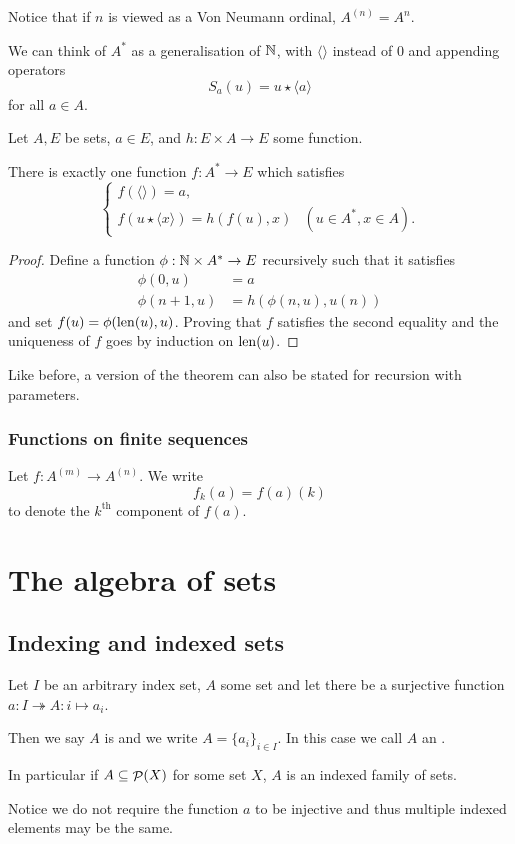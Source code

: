 Notice that if $n$ is viewed as a Von Neumann ordinal, $A^{(n)} = A^n$.

We can think of $A^*$ as a generalisation of $\mathbb{N}$, with $\langle\rangle$ instead of $0$ and appending operators
\[ S_a(u) = u\star \langle a\rangle \]
for all $a\in A$.
\begin{theorem}
Let $A,E$ be sets, $a\in E$, and $h:E\times A\to E$ some function.

There is exactly one function $f: A^*\to E$ which satisfies
\[ \begin{cases}
f(\langle\rangle) = a, \\
f(u\star \langle x\rangle) = h(f(u), x) & (u\in A^*, x\in A).
\end{cases} \]
\end{theorem}
\begin{proof}
Define a function $\phi: \mathbb{N} \times A^*\to E$ recursively such that it satisfies
\begin{align*}
\phi(0,u) &= a \\
\phi(n+1,u) &= h(\phi(n,u), u(n))
\end{align*}
and set $f(u) = \phi(\operatorname{len}(u), u)$. Proving that $f$ satisfies the second equality and the uniqueness of $f$ goes by induction on $\operatorname{len}(u)$.
\end{proof}
Like before, a version of the theorem can also be stated for recursion with parameters.
\subsection{Functions on finite sequences}
Let $f: A^{(m)}\to A^{(n)}$. We write
\[ f_k(a) = f(a)(k) \]
to denote the $k^\text{th}$ component of $f(a)$.

\chapter{The algebra of sets}
\section{Indexing and indexed sets}
\begin{definition}
Let $I$ be an arbitrary index set, $A$ some set and let there be a surjective function $a: I\twoheadrightarrow A: i \mapsto a_i$.

Then we say $A$ is  and we write $A = \{a_i\}_{i\in I}$. In this case we call $A$ an .

In particular if $A\subseteq \mathop{\mathcal{P}}(X)$ for some set $X$, $A$ is an indexed family of sets.
\end{definition}
Notice we do not require the function $a$ to be injective and thus multiple indexed elements may be the same.

